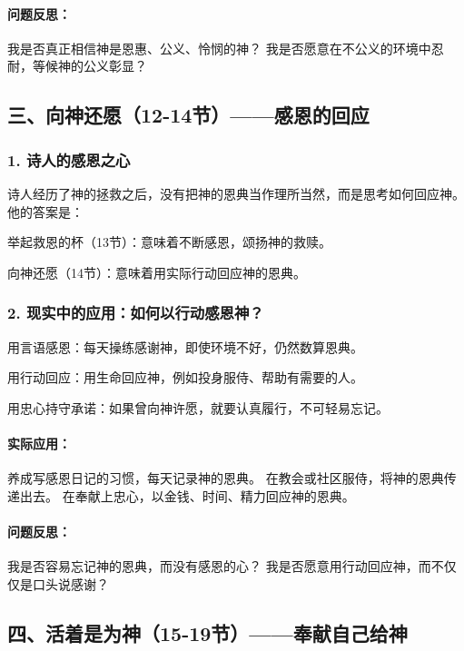 \documentclass[a4paper, 12pt]{article}
\begin{document}
\paragraph*{问题反思：}

我是否真正相信神是恩惠、公义、怜悯的神？
我是否愿意在不公义的环境中忍耐，等候神的公义彰显？
\subsection*{三、向神还愿（12-14节）——感恩的回应}

\subsubsection*{1. 诗人的感恩之心}
诗人经历了神的拯救之后，没有把神的恩典当作理所当然，而是思考如何回应神。他的答案是：

举起救恩的杯（13节）：意味着不断感恩，颂扬神的救赎。

向神还愿（14节）：意味着用实际行动回应神的恩典。
\subsubsection*{2. 现实中的应用：如何以行动感恩神？}

\hspace{0.6cm}用言语感恩：每天操练感谢神，即使环境不好，仍然数算恩典。

用行动回应：用生命回应神，例如投身服侍、帮助有需要的人。

用忠心持守承诺：如果曾向神许愿，就要认真履行，不可轻易忘记。

\paragraph*{实际应用：}

养成写感恩日记的习惯，每天记录神的恩典。
在教会或社区服侍，将神的恩典传递出去。
在奉献上忠心，以金钱、时间、精力回应神的恩典。
\paragraph*{问题反思：}

我是否容易忘记神的恩典，而没有感恩的心？
我是否愿意用行动回应神，而不仅仅是口头说感谢？
\subsection*{四、活着是为神（15-19节）——奉献自己给神}
\end{document}

